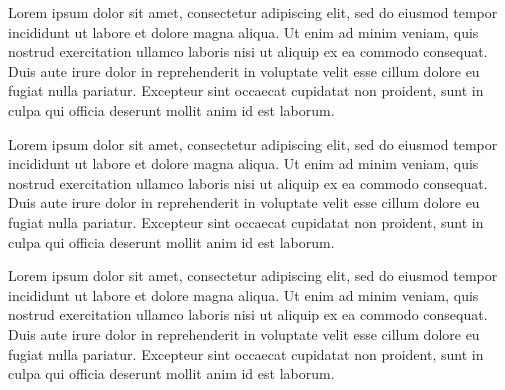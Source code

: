 Lorem ipsum dolor sit amet, consectetur adipiscing elit, sed do eiusmod tempor incididunt ut labore et dolore magna aliqua. Ut enim ad minim veniam, quis nostrud exercitation ullamco laboris nisi ut aliquip ex ea commodo consequat. Duis aute irure dolor in reprehenderit in voluptate velit esse cillum dolore eu fugiat nulla pariatur. Excepteur sint occaecat cupidatat non proident, sunt in culpa qui officia deserunt mollit anim id est laborum.


Lorem ipsum dolor sit amet, consectetur adipiscing elit, sed do eiusmod tempor incididunt ut labore et dolore magna aliqua. Ut enim ad minim veniam, quis nostrud exercitation ullamco laboris nisi ut aliquip ex ea commodo consequat. Duis aute irure dolor in reprehenderit in voluptate velit esse cillum dolore eu fugiat nulla pariatur. Excepteur sint occaecat cupidatat non proident, sunt in culpa qui officia deserunt mollit anim id est laborum.



Lorem ipsum dolor sit amet, consectetur adipiscing elit, sed do eiusmod tempor incididunt ut labore et dolore magna aliqua. Ut enim ad minim veniam, quis nostrud exercitation ullamco laboris nisi ut aliquip ex ea commodo consequat. Duis aute irure dolor in reprehenderit in voluptate velit esse cillum dolore eu fugiat nulla pariatur. Excepteur sint occaecat cupidatat non proident, sunt in culpa qui officia deserunt mollit anim id est laborum.



